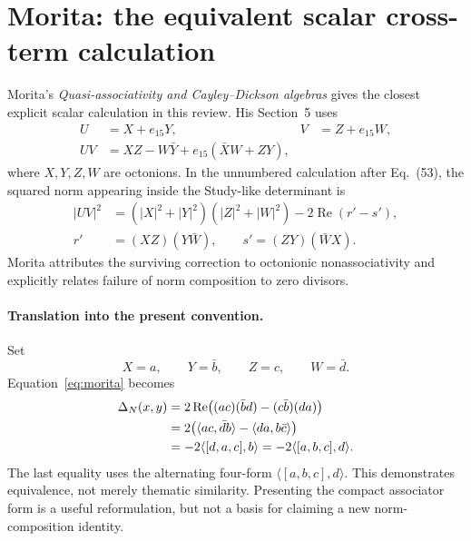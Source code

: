 \documentclass[11pt,a4paper]{article}
\newcommand{\ip}[2]{\langle #1,#2\rangle}
\newcommand{\DN}{\Delta_N}
\DeclareMathOperator{\Rea}{Re}
\numberwithin{equation}{section}
\begin{document}
\section{Morita: the equivalent scalar cross-term calculation}
\label{sec:morita}

Morita's \emph{Quasi-associativity and Cayley--Dickson algebras} gives the
closest explicit scalar calculation in this review.
His Section~5 uses
\begin{equation}
 \begin{aligned}
 U&=X+e_{15}Y, &V&=Z+e_{15}W,\\
 UV&=XZ-W\bar Y+e_{15}(\bar XW+ZY),
 \end{aligned}
\end{equation}
where $X,Y,Z,W$ are octonions. In the unnumbered calculation after
Eq.~(53), the squared norm appearing inside the Study-like determinant
is
\begin{equation}
 \begin{aligned}
 |UV|^2&=(|X|^2+|Y|^2)(|Z|^2+|W|^2)
          -2\Rea(r'-s'),\\
 r'&=(XZ)(Y\bar W),\qquad
 s'=(ZY)(\bar WX).
 \end{aligned}
 \label{eq:morita}
\end{equation}
Morita attributes the surviving correction to octonionic
nonassociativity and explicitly relates failure of norm composition to
zero divisors.~\citep[Sec.~5, Eq.~(52a) and the calculation after Eq.~(53)]{Morita2014QuasiAssociativity}

\paragraph{Translation into the present convention.}
Set
\begin{equation}
 X=a,\qquad Y=\bar b,\qquad Z=c,\qquad W=\bar d.
\end{equation}
Equation~\eqref{eq:morita} becomes
\begin{align}
 \DN(x,y)
 &=2\Rea\bigl((ac)(\bar b d)-(c\bar b)(da)\bigr)\notag\\
 &=2\bigl(\ip{ac}{\bar d b}-\ip{da}{b\bar c}\bigr)\notag\\
 &=-2\ip{[d,a,c]}{b}
  =-2\ip{[a,b,c]}{d}.
 \label{eq:translation}
\end{align}
The last equality uses the alternating four-form
$\ip{[a,b,c]}{d}$.
This demonstrates equivalence, not merely thematic similarity.
Presenting the compact associator form is a useful reformulation, but
not a basis for claiming a new norm-composition identity.
\end{document}
